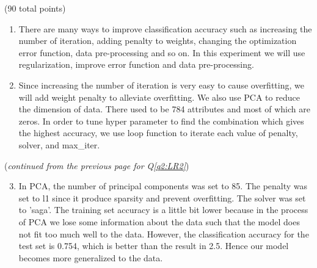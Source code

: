 \documentclass[12pt]{article}
\begin{document}
\begin{question}{(90 total points) \qTwoTitle}
\begin{subquestion}
  \begin{answerbox}{0.7\textheight}
    \begin{enumerate}
    \item There are many ways to improve classification accuracy such as increasing the number of iteration, adding penalty to weights, changing the optimization error function, data pre-processing and so on. In this experiment we will use regularization, improve error function and data pre-processing.
    \item Since increasing the number of iteration is very easy to cause overfitting, we will add weight penalty to alleviate overfitting. We also use PCA to reduce the dimension of data. There used to be 784 attributes and most of which are zeros. In order to tune hyper parameter to find the combination which gives the highest accuracy, we use loop function to iterate each value of penalty, solver, and max\_iter.
    \end{enumerate}
  \end{answerbox}
  \clearpage
  ({\it continued from the previous page for Q\ref{q2:LR2}})
  \begin{answerbox}{0.95\textheight}
    \begin{enumerate}\setcounter{enumi}{2}
    \item In PCA, the number of principal components was set to 85. The penalty was set to l1 since it produce sparsity and prevent overfitting. The solver was set to 'saga'. The training set accuracy is a little bit lower because in the process of PCA we lose some information about the data such that the model does not fit too much well to the data. However, the classification accuracy for the test set is 0.754, which is better than the result in 2.5. Hence our model becomes more generalized to the data.
    \end{enumerate}
  \end{answerbox}
  


\end{subquestion}


\end{question}
\end{document}
